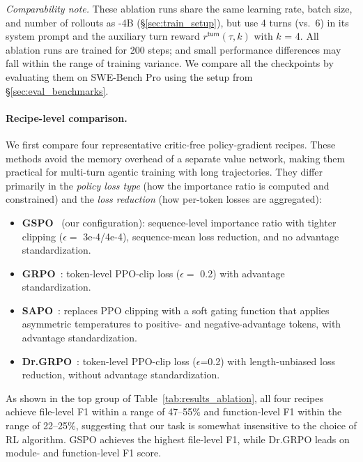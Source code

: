 \emph{Comparability note.} These ablation runs share the same learning rate, batch size, and number of rollouts as \methodname-4B (\S\ref{sec:train_setup}), but use 4 turns (vs.\ 6) in its system prompt and the auxiliary turn reward $r^{\mathsf{turn}}(\tau, k)$ with $k$ = 4. All ablation runs are trained for 200 steps; and small performance differences may fall within the range of training variance. We compare all the checkpoints by evaluating them on SWE-Bench Pro using the setup from \S\ref{sec:eval_benchmarks}.

\paragraph{Recipe-level comparison.}
We first compare four representative critic-free policy-gradient recipes. These methods avoid the memory overhead of a separate value network, making them practical for multi-turn agentic training with long trajectories. They differ primarily in the \emph{policy loss type} (how the importance ratio is computed and constrained) and the \emph{loss reduction} (how per-token losses are aggregated):
\begin{itemize}
    \item \textbf{GSPO}~\citep{zheng2025groupsequencepolicyoptimization} (our configuration): sequence-level importance ratio with tighter clipping ($\epsilon = $ 3e-4/4e-4), sequence-mean loss reduction, and no advantage standardization.
    \item \textbf{GRPO}~\citep{shao2024deepseekmathpushinglimitsmathematical}: token-level PPO-clip loss ($\epsilon = $ 0.2) with advantage standardization.
    \item \textbf{SAPO}~\citep{gao2025softadaptivepolicyoptimization}: replaces PPO clipping with a soft gating function that applies asymmetric temperatures to positive- and negative-advantage tokens, with advantage standardization.
    \item \textbf{Dr.GRPO}~\citep{liu2025understandingr1zeroliketrainingcritical}: token-level PPO-clip loss ($\epsilon$=0.2) with length-unbiased loss reduction, without advantage standardization.
\end{itemize}
As shown in the top group of Table~\ref{tab:results_ablation}, all four recipes achieve file-level F1 within a range of 47--55\% and function-level F1 within the range of 22--25\%, suggesting that our task is somewhat insensitive to the choice of RL algorithm. GSPO achieves the highest file-level F1, while Dr.GRPO leads on module- and function-level F1 score.

